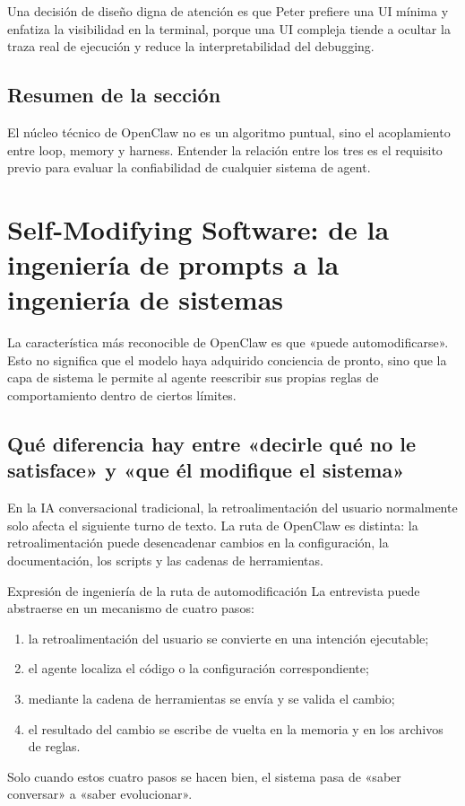 \documentclass[a4paper]{article}
\begin{document}
Una decisión de diseño digna de atención es que Peter prefiere una UI mínima y enfatiza la visibilidad en la terminal, porque una UI compleja tiende a ocultar la traza real de ejecución y reduce la interpretabilidad del debugging.

\subsection{Resumen de la sección}
El núcleo técnico de OpenClaw no es un algoritmo puntual, sino el acoplamiento entre loop, memory y harness. Entender la relación entre los tres es el requisito previo para evaluar la confiabilidad de cualquier sistema de agent.
\section{Self-Modifying Software: de la ingeniería de prompts a la ingeniería de sistemas}

La característica más reconocible de OpenClaw es que «puede automodificarse». Esto no significa que el modelo haya adquirido conciencia de pronto, sino que la capa de sistema le permite al agente reescribir sus propias reglas de comportamiento dentro de ciertos límites.

\subsection{Qué diferencia hay entre «decirle qué no le satisface» y «que él modifique el sistema»}

En la IA conversacional tradicional, la retroalimentación del usuario normalmente solo afecta el siguiente turno de texto. La ruta de OpenClaw es distinta: la retroalimentación puede desencadenar cambios en la configuración, la documentación, los scripts y las cadenas de herramientas.

\begin{importantbox}{Expresión de ingeniería de la ruta de automodificación}
La entrevista puede abstraerse en un mecanismo de cuatro pasos:
\begin{enumerate}
    \item la retroalimentación del usuario se convierte en una intención ejecutable;
    \item el agente localiza el código o la configuración correspondiente;
    \item mediante la cadena de herramientas se envía y se valida el cambio;
    \item el resultado del cambio se escribe de vuelta en la memoria y en los archivos de reglas.
\end{enumerate}
Solo cuando estos cuatro pasos se hacen bien, el sistema pasa de «saber conversar» a «saber evolucionar».
\end{importantbox}
\end{document}
